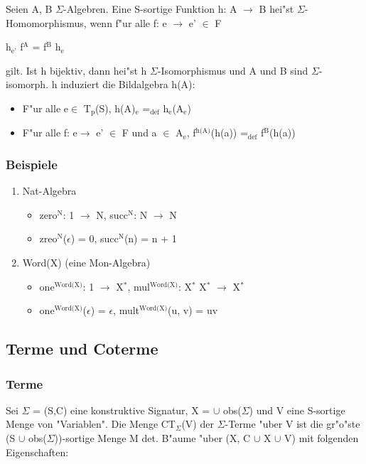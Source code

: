 \documentclass[11pt]{article}
\begin{document}
Seien A, B $\Sigma$-Algebren. Eine S-sortige Funktion h: A $\to$ B hei"st $\Sigma$-Homomorphismus, wenn f"ur alle f: e $\to$ e' $\in$ F
\begin{center}
h$_{\text{e'}}$ \bigcirc f$^{\text{A}}$ = f$^{\text{B}}$ \bigcirc h$_{\text{e}}$
\end{center}
gilt. Ist h bijektiv, dann hei"st h $\Sigma$-Isomorphismus und A und B sind $\Sigma$-isomorph. h induziert die Bildalgebra h(A):
\begin{itemize}
\item F"ur alle e$\in$ T$_{\text{p}}$(S), h(A)$_{\text{e}}$ =$_{\text{def}}$ h$_{\text{e}}$(A$_{\text{e}}$)
\item F"ur alle f: e$\to$ e' $\in$ F und a $\in$ A$_{\text{e}}$, f$^{\text{h(A)}}$(h(a)) =$_{\text{def}}$ f$^{\text{B}}$(h(a))
\end{itemize}

\subsubsection{Beispiele}
\label{sec-2-6-1}

\begin{enumerate}
\item Nat-Algebra
\label{sec-2-6-1-1}
\begin{itemize}
\item zero$^{\text{N}}$: 1 $\to$ N, succ$^{\text{N}}$: N $\to$ N
\item zreo$^{\text{N}}$($\epsilon$) = 0, succ$^{\text{N}}$(n) = n + 1
\end{itemize}

\item Word(X) (eine Mon-Algebra)
\label{sec-2-6-1-2}
\begin{itemize}
\item one$^{\text{Word(X)}}$: 1 $\to$ X$^{\text{*}}$, mul$^{\text{Word(X)}}$: X$^{\text{*}}$ \texttimes{} X$^{\text{*}}$ $\to$ X$^{\text{*}}$
\item one$^{\text{Word(X)}}$($\epsilon$) = $\epsilon$, mult$^{\text{Word(X)}}$(u, v) = uv
\end{itemize}
\end{enumerate}


\subsection{Terme und Coterme}
\label{sec-2-7}
\subsubsection{Terme}
\label{sec-2-7-1}
Sei $\Sigma$ = (S,C) eine konstruktive Signatur, X = $\cup$ obs($\Sigma$) und V eine S-sortige Menge von "Variablen".
Die Menge CT$_{\Sigma}$(V) der $\Sigma$-Terme "uber V ist die gr"o"ste (S $\cup$ obs($\Sigma$))-sortige Menge M  det. B"aume "uber (X, C $\cup$ X $\cup$ V)
mit folgenden Eigenschaften:
\end{document}

